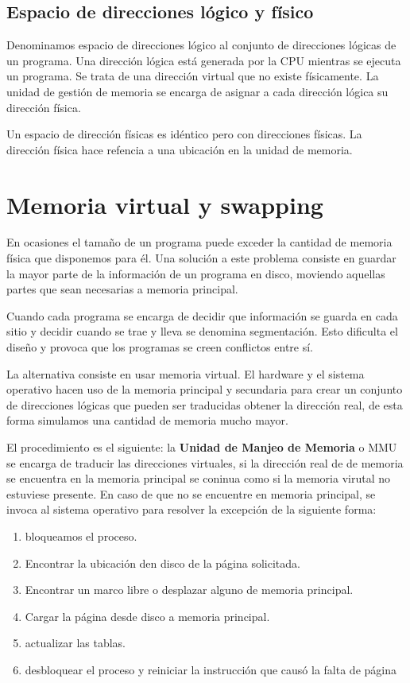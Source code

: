 \subsection*{Espacio de direcciones lógico y físico}

Denominamos espacio de direcciones lógico al conjunto de direcciones lógicas de un programa. Una dirección lógica  está generada por la CPU mientras se ejecuta un programa. Se trata de una dirección virtual que no existe físicamente. La unidad de gestión de memoria se encarga de asignar a cada dirección lógica su dirección física.

Un espacio de dirección físicas es idéntico pero con direcciones físicas. La dirección física hace refencia a una ubicación en la unidad de memoria.

\section*{Memoria virtual y swapping}
En ocasiones el tamaño de un programa puede exceder la cantidad de memoria física que disponemos para él. Una solución a este problema consiste en guardar la mayor parte de la información de un programa en disco, moviendo aquellas partes que sean necesarias a memoria principal.

Cuando cada programa se encarga de decidir que información se guarda en cada sitio y decidir cuando se trae y lleva se denomina segmentación. Esto dificulta el diseño y provoca que los programas se creen conflictos entre sí.

La alternativa consiste en usar memoria virtual. El hardware y el sistema operativo hacen uso de la memoria principal y secundaria para crear un conjunto de direcciones lógicas que pueden ser traducidas obtener la dirección real, de esta forma simulamos una cantidad de memoria mucho mayor.

El procedimiento es el siguiente: la \textbf{Unidad de Manjeo de Memoria} o MMU se encarga de traducir las direcciones virtuales, si la dirección real de de memoria se encuentra en la memoria principal se coninua como si la memoria virutal no estuviese presente. En caso de que no se encuentre en memoria principal, se invoca al sistema operativo para resolver la excepción de la siguiente forma:

\begin{enumerate}
	\item bloqueamos el proceso.
	\item Encontrar la ubicación den disco de la página solicitada.
	\item Encontrar un marco libre o desplazar alguno de memoria principal.
	\item Cargar la página desde disco a memoria principal.
	\item actualizar las tablas.
	\item desbloquear el proceso y reiniciar la instrucción que causó la falta de página
\end{enumerate}

